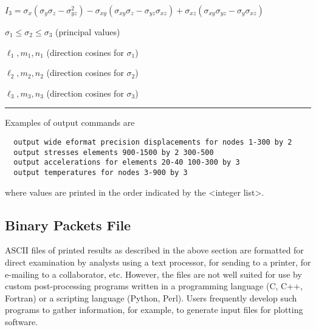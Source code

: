 \documentclass[11pt]{report}
\numberwithin{equation}{section}
\newcommand{\nin} {\noindent}
\newcommand{\tl}{\textless\xspace}
\newcommand{\tg}{\textgreater\xspace}
\begin{document}
 \nin $I_3 = \sigma_x \left ( \sigma_y\sigma_z - \sigma_{yz}^2 \right ) - 
       \sigma_{xy} \left ( \sigma_{xy}\sigma_z - \sigma_{yz}\sigma_{xz} \right ) +
       \sigma_{xz} \left ( \sigma_{xy}\sigma_{yz} - \sigma_y\sigma_{xz} \right ) $ 
       
\nin $\sigma_1 \le \sigma_2 \le \sigma_3$ (principal values)

\nin $\ell_1, m_1, n_1$  (direction cosines for $\sigma_1$)

\nin $\ell_2, m_2, n_2$ (direction cosines for $\sigma_2$)

\nin $\ell_3, m_3, n_3$ (direction cosines for $\sigma_3$)
\vspace{0.1in}\hrule \vspace{0.1in}
\normalsize


\nin Examples of output commands are
\small
\begin{verbatim}
  output wide eformat precision displacements for nodes 1-300 by 2
  output stresses elements 900-1500 by 2 300-500
  output accelerations for elements 20-40 100-300 by 3
  output temperatures for nodes 3-900 by 3
\end{verbatim}
\normalsize
where values are printed in the order indicated by the \tl{integer list}\tg.

\subsection{Binary Packets File}
\nin
ASCII files of printed results as described in the above section are formatted for
direct examination by analysts using a text processor, for sending to a 
printer, for e-mailing to a collaborator, etc. However, the files are not well
suited for use by custom post-processing programs written in a programming
language (C, C++, Fortran) or a scripting language (Python, Perl). Users frequently
develop such programs to gather information, for example, to generate input files for 
plotting software.
\end{document}
